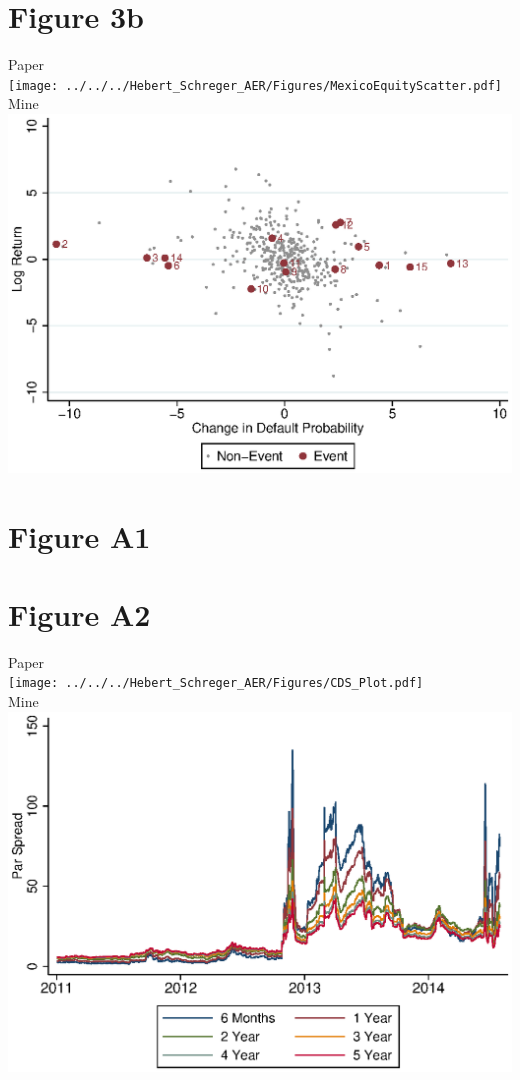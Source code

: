 \documentclass{article}
\begin{document}
\section{Figure 3b}
Paper \\
\texttt{[image: ../../../Hebert\_Schreger\_AER/Figures/MexicoEquityScatter.pdf]}\\
Mine \\
\includegraphics[scale = .8]{MexicoEquityScatter.eps}\\
\newpage
\section{Figure A1}

\newpage
\section{Figure A2}
Paper \\
\texttt{[image: ../../../Hebert\_Schreger\_AER/Figures/CDS\_Plot.pdf]}\\
Mine \\
\includegraphics[scale = .8]{CDS_Plot.eps}\\
\end{document}
